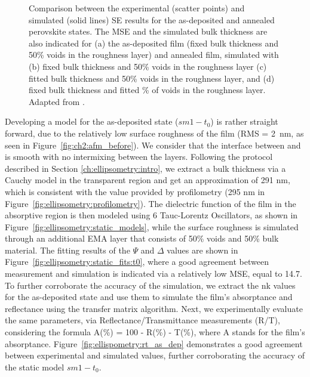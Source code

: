 \begin{figure}[t]
\begin{subfigure}[t]{0.4\textwidth}
        \caption{}
        \label{fig:ellipsometry:static_fits:t23_fixed_thick_x_void}
    \end{subfigure}
    \caption[Comparison between the experimental (scatter points) and simulated (solid lines) SE results for the as-deposited and annealed perovskite states.]{Comparison between the experimental (scatter points) and simulated (solid lines) SE results for the as-deposited and annealed perovskite states. The MSE and the simulated bulk thickness are also indicated for (a) the as-deposited film (fixed bulk thickness and 50\% voids in the roughness layer) and annealed film, simulated with (b) fixed bulk thickness and 50\% voids in the roughness layer (c) fitted bulk thickness and 50\% voids in the roughness layer, and (d) fixed bulk thickness and fitted \% of voids in the roughness layer. Adapted from \cite{Papadopoulou2024InEllipsometry}.}
    \label{fig:ellipsometry:static_fits}
\end{figure}

Developing a model for the as-deposited state ($sm1-t_0$) is rather straight forward, due to the relatively low surface roughness of the film (RMS = 2~nm, as seen in Figure~\ref{fig:ch2:afm_before}). We consider that the interface between  and  is smooth with no intermixing between the layers. Following the protocol described in Section \ref{ch:ellipsometry:intro}, we extract a bulk thickness via a Cauchy model in the transparent region and get an approximation of 291 nm, which is consistent with the value provided by profilometry (295 nm in Figure~\ref{fig:ellipsometry:profilometry}). The dielectric function of the film in the absorptive region is then modeled using 6 Tauc-Lorentz Oscillators, as shown in Figure~\ref{fig:ellipsometry:static_models}, while the surface roughness is simulated through an additional EMA layer that consists of 50\% voids and 50\% bulk material. The fitting results of the $\Psi$ and $\Delta$ values are shown in Figure~\ref{fig:ellipsometry:static_fits:t0}, where a good agreement between measurement and simulation is indicated via a relatively low MSE, equal to 14.7. To further corroborate the accuracy of the simulation, we extract the nk values for the as-deposited state and use them to simulate the film's absorptance and reflectance using the transfer matrix algorithm. Next, we experimentally evaluate the same parameters, via Reflectance/Transmittance measurements (R/T), considering the formula A(\%) = 100 - R(\%) - T(\%), where A stands for the film's absorptance. Figure~\ref{fig:ellispometry:rt_as_dep} demonstrates a good agreement between experimental and simulated values, further corroborating the accuracy of the static model $sm1-t_0$.


